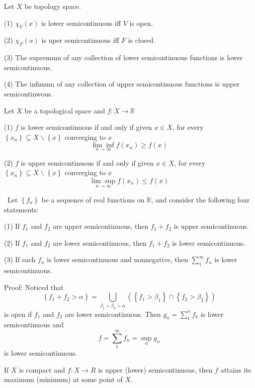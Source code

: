 \documentclass[12pt, a4paper, oneside]{book}
\begin{document}
\begin{theorem}
    Let $X$ be topology space.

    (1) $\chi_V (x)$ is lower semicontinuous iff $V$ is open.

    (2) $\chi_F (x)$ is uper semicontinuous iff $F$ is closed.

    (3) The supremum of any collection of lower semicontinuous functions is lower semicontinuous.

    (4) The infimum of any collection of upper semicontinuous
    functions is upper semicontinwous.
\end{theorem}

\begin{theorem}
    Let $X$ be a topological space and $f: X \rightarrow \mathbb{R}$

    (1) $f$ is lower semicontinuous if and only if given $x \in X$, for every $\left\{x_n\right\} \subseteq X \backslash\left\{x\right\}$ converging to $x$
    $$\underset{n\to \infty}{\lim\inf} f(x_n)\geq f(x)$$


    (2) $f$ is upper semicontinuous if and only if given $x \in X$, for every $\left\{x_n\right\} \subseteq X \backslash\left\{x\right\}$ converging to $x$
    $$\underset{n\to \infty}{\lim\sup} f(x_n)\leq f(x)$$
\end{theorem}

\begin{theorem}\
    Let $\left\{f_{n}\right\}$ be a sequence of real functions on $\mathbb{R}$, and consider the following four statements:

    (1) If $f_{1}$ and $f_{2}$ are upper semicontinuous, then $f_{1}+f_{2}$ is upper semicontinuous.

    (2) If $f_{1}$ and $f_{2}$ are lower semicontinuous, then $f_{1}+f_{2}$ is lower semicontinuous.

    (3) If each $f_{n}$ is lower semicontinuous and nonnegative, then $\sum\limits_{1}^{\infty} f_{n}$ is lower semicontinuous.

    Proof:
    Noticed that
    $$\left\{f_1+f_2 > \alpha\right\}= \bigcup_{\beta_1 +\beta_2 > \alpha} \left(\left\{ f_1 > \beta_1\right\}\cap \left\{ f_2 > \beta_2\right\}\right)$$
    is open if $f_1$ and $f_2$ are lower semicontinuous. Then $g_n=\sum\limits_{1}^n f_k$ is lower semicontinuous and
    $$f=\sum\limits_{1}^{\infty} f_{n} = \sup\limits_n g_n$$
    is lower semicontinuous.
\end{theorem}
\begin{theorem}
    If $X$ is compact and $f: X \longrightarrow R$ is upper (lower) semicontinuous, then $f$ attains its maximum (minimum) at some point of $X$.
\end{theorem}
\end{document}
